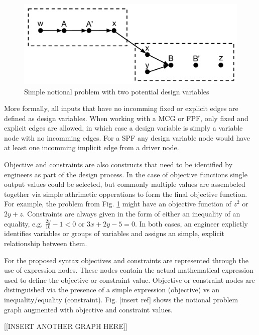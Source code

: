 \begin{figure}[htb!]
  \begin{center}
    \includegraphics[width=.6\textwidth]{images/design_vars_graph}
  \end{center}
  \caption{Simple notional problem with two potential design variables \label{f:design vars}}
\end{figure}

More formally, all inputs that have no incomming fixed or explicit edges are defined
as design variables. When working with a MCG or FPF, only fixed and explicit edges are allowed, 
in which case a design variable is simply a variable node with no incomming edges. For a SPF 
any design variable node would have at least one incomming implicit edge from a driver node. 

Objective and constraints are also constructs that need to be identified by engineers 
as part of the design process. In the case of objective functions single output values 
could be selected, but commonly multiple values are assembeled together via simple 
athrimetic opperations to form the final objective function. For example, the problem from 
Fig. \ref{f:design vars} might have an objective function of $z^2$ or $2y + z$. Constraints are 
always given in the form of either an inequality of an equality, e.g. 
$\frac{2y}{10}-1<0$ or $3x+2y - 5=0$. In both cases, an engineer explictly identifies variables 
or groups of variables and assigns an simple, explicit relationship between them. 

For the proposed syntax objectives and constraints are represented through the use of 
expression nodes. These nodes contain the actual mathematical expression used to define the 
objective or constraint value. Objective or constraint nodes are distinguished
via the presence of a simple expression (objective) vs an inequality/equality (constraint). 
Fig. [insert ref] shows the notional problem graph augmented with objective and 
constraint values. 

[[INSERT ANOTHER GRAPH HERE]]

